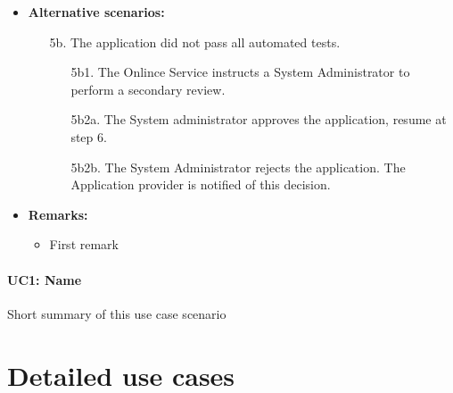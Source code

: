 \documentclass[english,peerreview]{sareport}
\begin{document}
\begin{itemize}
    \item \textbf{Alternative scenarios:} 
    \begin{enumerate}
        \item [5b.] The application did not pass all automated tests.
	\begin{enumerate}
		\item [5b1.] The Onlince Service instructs a System Administrator to perform a secondary review.
		\item [5b2a.] The System administrator approves the application, resume at step 6.
		\item [5b2b.] The System Administrator rejects the application. The Application provider is notified of this decision.
	\end{enumerate}
    \end{enumerate}
    
    \item \textbf{Remarks:}
        \begin{itemize}
            \item First remark
        \end{itemize}
\end{itemize}

\paragraph{UC1: Name}
Short summary of this use case scenario

\section{Detailed use cases}
\end{document}

